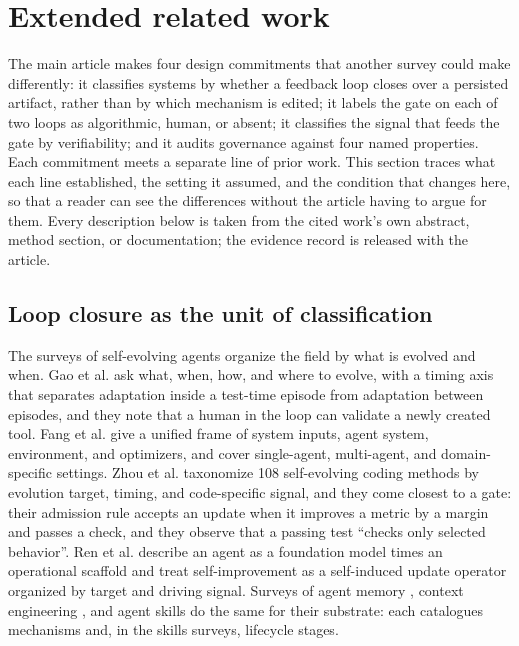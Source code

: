 \documentclass[
  11pt,
]{article}
\begin{document}
\endgroup

\section{Extended related work}\label{app:related}

The main article makes four design commitments that another survey could make differently: it classifies systems by whether a feedback loop closes over a persisted artifact, rather than by which mechanism is edited; it labels the gate on each of two loops as algorithmic, human, or absent; it classifies the signal that feeds the gate by verifiability; and it audits governance against four named properties. Each commitment meets a separate line of prior work. This section traces what each line established, the setting it assumed, and the condition that changes here, so that a reader can see the differences without the article having to argue for them. Every description below is taken from the cited work's own abstract, method section, or documentation; the evidence record is released with the article.

\subsection{Loop closure as the unit of classification}\label{app:related-1}

The surveys of self-evolving agents organize the field by what is evolved and when. Gao et al. \cite{gao2026selfevolving} ask what, when, how, and where to evolve, with a timing axis that separates adaptation inside a test-time episode from adaptation between episodes, and they note that a human in the loop can validate a newly created tool. Fang et al. \cite{fang2025comprehensive} give a unified frame of system inputs, agent system, environment, and optimizers, and cover single-agent, multi-agent, and domain-specific settings. Zhou et al. \cite{zhou2026selfevolvingcoding} taxonomize 108 self-evolving coding methods by evolution target, timing, and code-specific signal, and they come closest to a gate: their admission rule accepts an update when it improves a metric by a margin and passes a check, and they observe that a passing test ``checks only selected behavior''. Ren et al. \cite{ren2026selfimprovementsurvey} describe an agent as a foundation model times an operational scaffold and treat self-improvement as a self-induced update operator organized by target and driving signal. Surveys of agent memory \cite{du2026memory, huang2026secondhalf, luo2026storage}, context engineering \cite{mei2025context, hua2025context2}, and agent skills \cite{zhou2026agentskills, ding2026skilleval, xia2026harnessing} do the same for their substrate: each catalogues mechanisms and, in the skills surveys, lifecycle stages.
\end{document}
